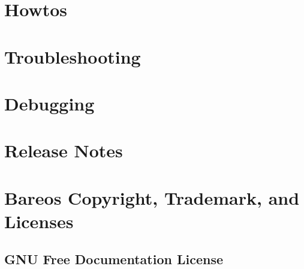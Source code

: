 \documentclass[10pt,a4paper]{book}
\begin{document}
%









\chapter{Howtos}





\chapter{Troubleshooting}


\chapter{Debugging}


\chapter{Release Notes}


\chapter{Bareos Copyright, Trademark, and Licenses}
\label{LicenseChapter}

    

\pagebreak
\section{GNU Free Documentation License}
    \label{fdl}
    

\pagebreak
\end{document}
